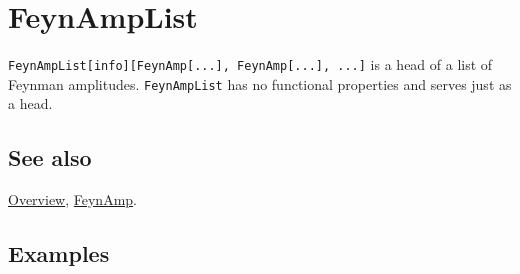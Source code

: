\documentclass[../FeynCalcManual.tex]{subfiles}
\begin{document}
\hypertarget{feynamplist}{%
\section{FeynAmpList}\label{feynamplist}}

\texttt{FeynAmpList[\allowbreak{}info][\allowbreak{}FeynAmp[\allowbreak{}...],\ \allowbreak{}FeynAmp[\allowbreak{}...],\ \allowbreak{}...]}
is a head of a list of Feynman amplitudes. \texttt{FeynAmpList} has no
functional properties and serves just as a head.

\subsection{See also}

\hyperlink{toc}{Overview}, \hyperlink{feynamp}{FeynAmp}.

\subsection{Examples}
\end{document}
